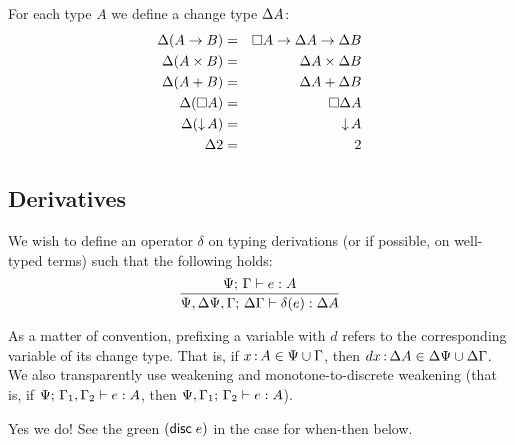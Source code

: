 \documentclass{article}
\begin{document}
For each type $A$ we define a change type $\Delta A$:
\begin{eqnarray*}
  \Delta(A \to B) &=& \square{A} \to \Delta A \to \Delta B\\
  \Delta(A \times B) &=& \Delta A \times \Delta B\\
  \Delta(A + B) &=& \Delta A + \Delta B\\
  \Delta(\square{A}) &=& \square{\Delta A}\\
  \Delta({\downarrow}\,{A}) &=& {\downarrow}\,{A}\\
  \Delta 2 &=& 2
\end{eqnarray*}



\subsection{Derivatives}

We wish to define an operator $\delta$ on typing derivations (or if possible, on
well-typed terms) such that the following holds:
\[\infer{\J{\GP,\GD\GP,\GG}{\GD\GG}{\delta(e)}{\Delta A}}
        {\J{\GP}{\GG}{e}{A}}
\]

As a matter of convention, prefixing a variable with $d$ refers to the
corresponding variable of its change type. That is, if $x \,{:}\, A \in \Psi \cup
\Gamma$, then $dx \,{:}\, \Delta A \in \Delta\Psi \cup \Delta\Gamma$. We also transparently use
weakening and monotone-to-discrete weakening (that is, if
${\Psi};\,{\Gamma_1,\Gamma_2}\vdash {e}:{A}$, then ${\Psi,\Gamma_1};\,{\Gamma_2}\vdash {e}:{A}$).

 {\color{green} Yes we do! See the
  green $(\mathsf{disc}\;{e})$ in the case for \textsf{when-then} below.}
\end{document}
